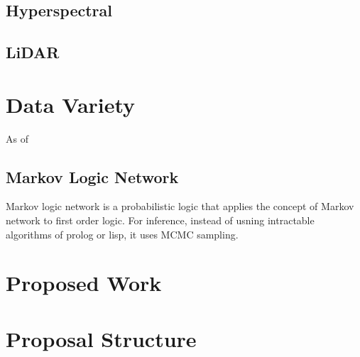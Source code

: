 \subsection{Hyperspectral}



\subsection{LiDAR}

\section{Data Variety}

As of 

\subsection{Markov Logic Network}
Markov logic network is a probabilistic logic that applies the concept of Markov network to first order logic. For inference, instead of usning intractable algorithms of prolog or lisp, it uses MCMC sampling.

\section{Proposed Work}

\section{Proposal Structure}

 
 
 
